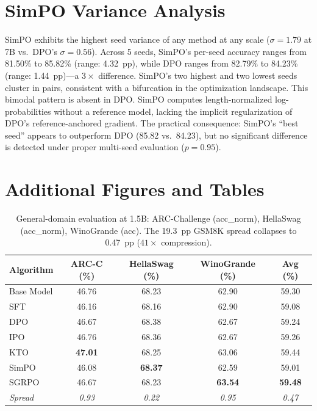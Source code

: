 \documentclass{article}
\begin{document}
\section{SimPO Variance Analysis}
\label{app:simpo_variance}

SimPO exhibits the highest seed variance of any method at any scale ($\sigma = 1.79$ at 7B vs.\ DPO's $\sigma = 0.56$). Across 5 seeds, SimPO's per-seed accuracy ranges from 81.50\% to 85.82\% (range: 4.32~pp), while DPO ranges from 82.79\% to 84.23\% (range: 1.44~pp)---a $3\times$ difference. SimPO's two highest and two lowest seeds cluster in pairs, consistent with a bifurcation in the optimization landscape. This bimodal pattern is absent in DPO. SimPO computes length-normalized log-probabilities without a reference model, lacking the implicit regularization of DPO's reference-anchored gradient. The practical consequence: SimPO's ``best seed'' appears to outperform DPO (85.82 vs.\ 84.23), but no significant difference is detected under proper multi-seed evaluation ($p = 0.95$).

\section{Additional Figures and Tables}
\label{app:figures}

\begin{table}[ht]
\centering
\caption{General-domain evaluation at 1.5B: ARC-Challenge (acc\_norm), HellaSwag (acc\_norm), WinoGrande (acc). The 19.3~pp GSM8K spread collapses to 0.47~pp ($41\times$ compression).}
\label{tab:general_domain_15b}
\small
\begin{tabular}{@{}lcccc@{}}
\toprule
\textbf{Algorithm} & \textbf{ARC-C (\%)} & \textbf{HellaSwag (\%)} & \textbf{WinoGrande (\%)} & \textbf{Avg (\%)} \\
\midrule
Base Model & 46.76 & 68.23 & 62.90 & 59.30 \\
\midrule
SFT & 46.16 & 68.16 & 62.90 & 59.08 \\
DPO & 46.67 & 68.38 & 62.67 & 59.24 \\
IPO & 46.76 & 68.36 & 62.67 & 59.26 \\
KTO & \textbf{47.01} & 68.25 & 63.06 & 59.44 \\
SimPO & 46.08 & \textbf{68.37} & 62.59 & 59.01 \\
SGRPO & 46.67 & 68.23 & \textbf{63.54} & \textbf{59.48} \\
\midrule
\textit{Spread} & \textit{0.93} & \textit{0.22} & \textit{0.95} & \textit{0.47} \\
\bottomrule
\end{tabular}
\end{table}
\end{document}
